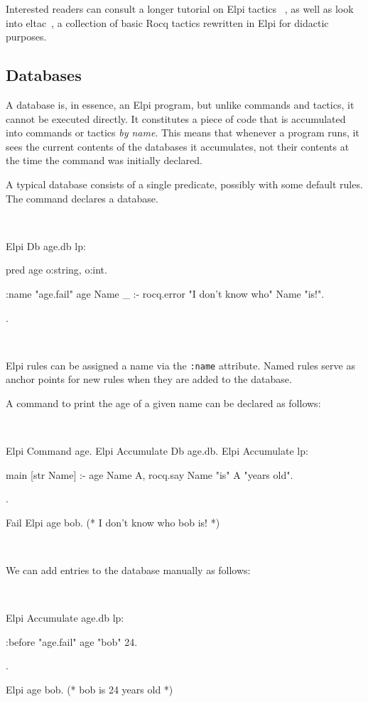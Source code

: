 \documentclass[a4paper, 11pt]{book}
\newenvironment{rocqcode}
  {\VerbatimEnvironment~\\\begin{rocqbox}\begin{xrocqcode}}{\end{xrocqcode}
\end{rocqbox}\\}
\begin{document}
Interested readers can consult a longer tutorial on Elpi tactics
~\cite{tuto:tactics}, as well as look into eltac~\cite{app:eltac},
a collection of basic Rocq tactics rewritten in Elpi for didactic purposes.

\subsection{Databases}\label{sec:homo}


A database is, in essence, an Elpi program, but unlike commands and tactics,
it cannot be executed directly. It constitutes a piece of code that is
accumulated into commands or tactics \emph{by name}. This means that whenever
a program runs, it sees the current contents of the databases it accumulates,
not their contents at the time the command was initially declared.


A typical database consists of a single predicate, possibly with some default
rules. The  command declares a database.

\begin{rocqcode}
Elpi Db age.db lp:{{
  pred age o:string, o:int.

  :name "age.fail"
  age Name _ :- rocq.error "I don't know who" Name "is!".
}}.
\end{rocqcode}


Elpi rules can be assigned a name via the \texttt{:name} attribute. Named rules
serve as anchor points for new rules when they are added to the database.


A command to print the age of a given name can be declared as follows:

\begin{rocqcode}
Elpi Command age.
Elpi Accumulate Db age.db.
Elpi Accumulate lp:{{

  main [str Name] :-
    age Name A,
    rocq.say Name "is" A "years old".

}}.

Fail Elpi age bob. (* I don't know who bob is! *)
\end{rocqcode}


We can add entries to the database manually as follows:

\begin{rocqcode}
Elpi Accumulate age.db lp:{{

  :before "age.fail"     %
  age "bob" 24.

}}.

Elpi age bob. (* bob is 24 years old *)
\end{rocqcode}
\end{document}
